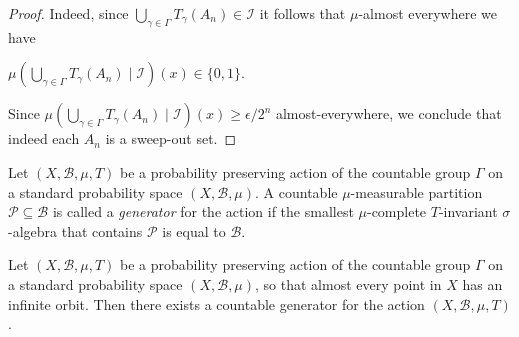 \documentclass[12pt,reqno]{amsart}
\begin{document}
\begin{proof}
Indeed, since $\bigcup_{\gamma \in \Gamma}T_\gamma(A_n) \in \mathcal{I}$ it follows that $\mu$-almost everywhere we have

$\mu( \bigcup_{\gamma \in \Gamma}T_\gamma(A_n) \mid \mathcal{I}) (x)\in \{0,1\}$.

Since $\mu( \bigcup_{\gamma \in \Gamma}T_\gamma(A_n) \mid \mathcal{I}) (x) \ge \epsilon/2^n$ almost-everywhere, we conclude that indeed
 each $A_n$ is a sweep-out set.



\end{proof}

\begin{definition}
Let $(X,\mathcal{B},\mu,T)$ be a probability preserving action of the countable group $\Gamma$ on a standard probability space $(X,\mathcal{B},\mu)$.  
A  countable $\mu$-measurable partition $\mathcal{P} \subseteq \mathcal{B}$  is called a \emph{generator} for the action if 
the smallest $\mu$-complete $T$-invariant $\sigma$-algebra that contains $\mathcal{P}$ is equal to $\mathcal{B}$.
\end{definition}

\begin{thm}\label{thm:countable_generator_group_action}
Let $(X,\mathcal{B},\mu,T)$ be a probability preserving action of the countable group $\Gamma$ on a standard probability space $(X,\mathcal{B},\mu)$, so that almost every point in $X$ has an infinite orbit.  Then there exists a countable generator for the action $(X,\mathcal{B},\mu,T)$.
\end{thm}
\end{document}
